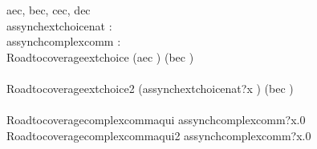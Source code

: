 \begin{circus}
\circchannel aec, bec, cec, dec \\
\circchannel assynchextchoicenat : \nat \\
\circchannel assynchcomplexcomm : \nat \cross \nat \\
\circprocess Roadtocoverageextchoice \circdef \circbegin
	\circspot
	    (aec \then \Skip) \extchoice (bec \then \Skip) \\
	\circend \\
\circprocess Roadtocoverageextchoice2 \circdef \circbegin
	\circspot
	    (assynchextchoicenat?x \then \Skip) \extchoice (bec \then \Skip) \\ %
	\circend \\
\circprocess Roadtocoveragecomplexcommaqui \circdef \circbegin
	\circspot
	    assynchcomplexcomm?x.0 \then \Skip
	\circend \\
\circprocess Roadtocoveragecomplexcommaqui2 \circdef \circbegin
	\circspot
	    assynchcomplexcomm?x.0 \then \Skip
	\circend \\
\end{circus}
